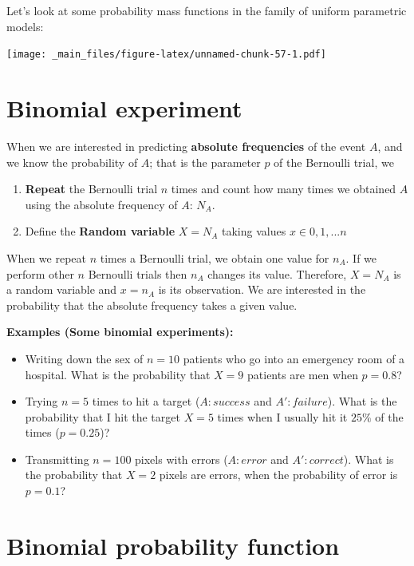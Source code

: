 \documentclass[
]{book}
\begin{document}
Let's look at some probability mass functions in the family of uniform parametric models:

\texttt{[image: \_main\_files/figure-latex/unnamed-chunk-57-1.pdf]}

\hypertarget{binomial-experiment}{%
\section{Binomial experiment}\label{binomial-experiment}}

When we are interested in predicting \textbf{absolute frequencies} of the event \(A\), and we know the probability of \(A\); that is the parameter \(p\) of the Bernoulli trial, we

\begin{enumerate}
\def\labelenumi{\arabic{enumi})}
\item
  \textbf{Repeat} the Bernoulli trial \(n\) times and count how many times we obtained \(A\) using the absolute frequency of \(A\): \(N_A\).
\item
  Define the \textbf{Random variable} \(X=N_A\) taking values \(x \in {0,1,...n}\)
\end{enumerate}

When we repeat \(n\) times a Bernoulli trial, we obtain one value for \(n_A\). If we perform other \(n\) Bernoulli trials then \(n_A\) changes its value. Therefore, \(X=N_A\) is a random variable and \(x=n_A\) is its observation. We are interested in the probability that the absolute frequency takes a given value.

\textbf{Examples (Some binomial experiments):}

\begin{itemize}
\item
  Writing down the sex of \(n=10\) patients who go into an emergency room of a hospital. What is the probability that \(X=9\) patients are men when \(p=0.8\)?
\item
  Trying \(n=5\) times to hit a target (\(A:success\) and \(A':failure\)). What is the probability that I hit the target \(X=5\) times when I usually hit it \(25\%\) of the times (\(p=0.25\))?
\item
  Transmitting \(n=100\) pixels with errors (\(A:error\) and \(A':correct\)). What is the probability that \(X=2\) pixels are errors, when the probability of error is \(p=0.1\)?
\end{itemize}

\hypertarget{binomial-probability-function}{%
\section{Binomial probability function}\label{binomial-probability-function}}
\end{document}
